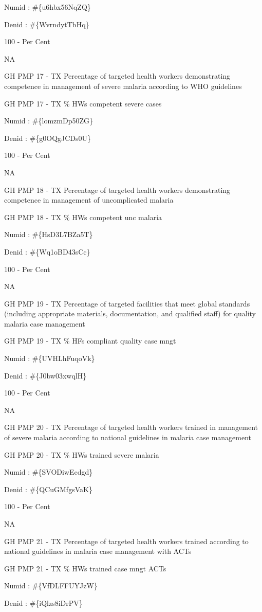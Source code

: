\documentclass[]{book}
\begin{document}
Numid : \#\{u6hbx56NqZQ\}

Denid : \#\{WvrndytTbHq\}

100 - Per Cent

NA

GH PMP 17 - TX Percentage of targeted health workers demonstrating competence in management of severe malaria according to WHO guidelines

GH PMP 17 - TX \% HWs competent severe cases

Numid : \#\{lomzmDp50ZG\}

Denid : \#\{g0OQgJCDs0U\}

100 - Per Cent

NA

GH PMP 18 - TX Percentage of targeted health workers demonstrating competence in management of uncomplicated malaria

GH PMP 18 - TX \% HWs competent unc malaria

Numid : \#\{HsD3L7BZa5T\}

Denid : \#\{Wq1oBD43sCc\}

100 - Per Cent

NA

GH PMP 19 - TX Percentage of targeted facilities that meet global standards (including appropriate materials, documentation, and qualified staff) for quality malaria case management

GH PMP 19 - TX \% HFs compliant quality case mngt

Numid : \#\{UVHLhFuqoVk\}

Denid : \#\{J0bw03xwqlH\}

100 - Per Cent

NA

GH PMP 20 - TX Percentage of targeted health workers trained in management of severe malaria according to national guidelines in malaria case management

GH PMP 20 - TX \% HWs trained severe malaria

Numid : \#\{SVODiwEcdgd\}

Denid : \#\{QCuGMfgsVaK\}

100 - Per Cent

NA

GH PMP 21 - TX Percentage of targeted health workers trained according to national guidelines in malaria case management with ACTs

GH PMP 21 - TX \% HWs trained case mngt ACTs

Numid : \#\{VfDLFFUYJzW\}

Denid : \#\{iQlzs8iDrPV\}
\end{document}
